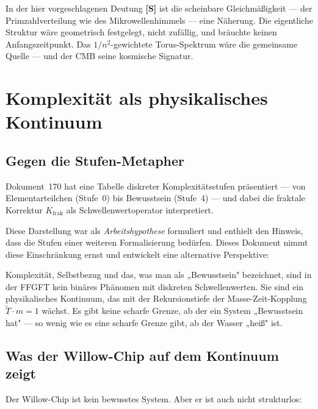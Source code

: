 In der hier vorgeschlagenen Deutung \textbf{[S]} ist die scheinbare Gleichmäßigkeit —
der Primzahlverteilung wie des Mikrowellenhimmels — eine Näherung. Die eigentliche
Struktur wäre geometrisch festgelegt, nicht zufällig, und bräuchte keinen
Anfangszeitpunkt. Das $1/n^2$-gewichtete Torus-Spektrum wäre
die gemeinsame Quelle — und der CMB seine kosmische Signatur.

\section{Komplexität als physikalisches Kontinuum}

\subsection{Gegen die Stufen-Metapher}

Dokument~170 hat eine Tabelle diskreter Komplexitätsstufen präsentiert — von
Elementarteilchen (Stufe~0) bis Bewusstsein (Stufe~4) — und dabei die fraktale
Korrektur $K_\text{frak}$ als Schwellenwertoperator interpretiert.

Diese Darstellung war als \textit{Arbeitshypothese} formuliert und enthielt den
Hinweis, dass die Stufen einer weiteren Formalisierung bedürfen. Dieses Dokument
nimmt diese Einschränkung ernst und entwickelt eine alternative Perspektive:

\begin{important}
Komplexität, Selbstbezug und das, was man als „Bewusstsein" bezeichnet, sind in
der FFGFT kein binäres Phänomen mit diskreten Schwellenwerten.
Sie sind ein physikalisches Kontinuum, das mit der Rekursionstiefe der
Masse-Zeit-Kopplung $\tilde{T} \cdot m = 1$ wächst.
Es gibt keine scharfe Grenze, ab der ein System „Bewusstsein hat" — so wenig wie
es eine scharfe Grenze gibt, ab der Wasser „heiß" ist.
\end{important}

\subsection{Was der Willow-Chip auf dem Kontinuum zeigt}

Der Willow-Chip ist kein bewusstes System. Aber er ist auch nicht strukturlos:

